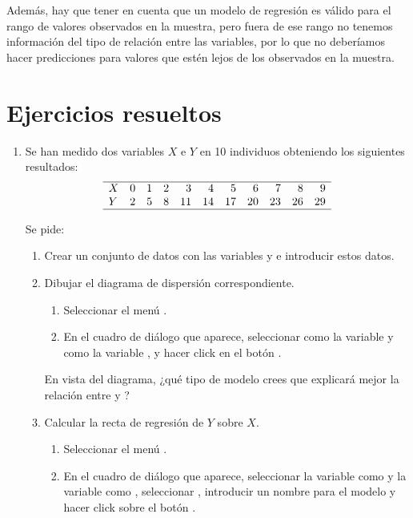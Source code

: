 Además, hay que tener en cuenta que un modelo de regresión es válido para el rango de valores observados en la muestra,
pero fuera de ese rango no tenemos información del tipo de relación entre las variables, por lo que no deberíamos hacer
predicciones para valores que estén lejos de los observados en la muestra.

\clearpage
\newpage



\section{Ejercicios resueltos}
\begin{enumerate}[leftmargin=*]
\item Se han medido dos variables $X$ e $Y$ en 10 individuos obteniendo los siguientes resultados:
\[
\begin{array}{lrrrrrrrrrr}
\hline
X & 0 & 1 & 2 & 3 & 4 & 5 & 6 & 7 & 8 & 9 \\
Y & 2 & 5 & 8 & 11 & 14 & 17 & 20 & 23 & 26 & 29\\
\hline
\end{array}
\]

Se pide:

\begin{enumerate}
\item  Crear un conjunto de datos con las variables  y  e introducir estos datos.
\item  Dibujar el diagrama de dispersión correspondiente.
\begin{indicacion}{
\begin{enumerate}
\item Seleccionar el menú .
\item En el cuadro de diálogo que aparece, seleccionar como  la variable  y como
 la variable , y hacer click en el botón .
\end{enumerate}}
\end{indicacion}

En vista del diagrama, ¿qué tipo de modelo crees que explicará mejor la relación entre   y ?

\item Calcular la recta de regresión de $Y$ sobre $X$.
\begin{indicacion}{
\begin{enumerate}
\item Seleccionar el menú .
\item En el cuadro de diálogo que aparece, seleccionar la variable  como  y la
variable  como , seleccionar , introducir un nombre
para el modelo y hacer click sobre el botón .
\end{enumerate}}
\end{indicacion}


\end{enumerate}
\end{enumerate}
